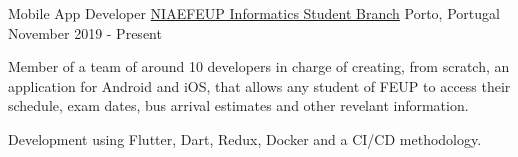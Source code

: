 \begin{cventries}
  \cventry
    {Mobile App Developer} %
    {\href{https://ni.fe.up.pt}{NIAEFEUP Informatics Student Branch}} %
    {Porto, Portugal} %
    {November 2019 - Present} %
    {
      \begin{cvitems} %
        \item {Member of a team of around 10 developers in charge of creating, from scratch, an application for Android and iOS, that allows any student of FEUP to access their schedule, exam dates, bus arrival estimates and other revelant information.}
        \item{Development using Flutter, Dart, Redux, Docker and a CI/CD methodology.}
      \end{cvitems}
    }
   
\end{cventries}

